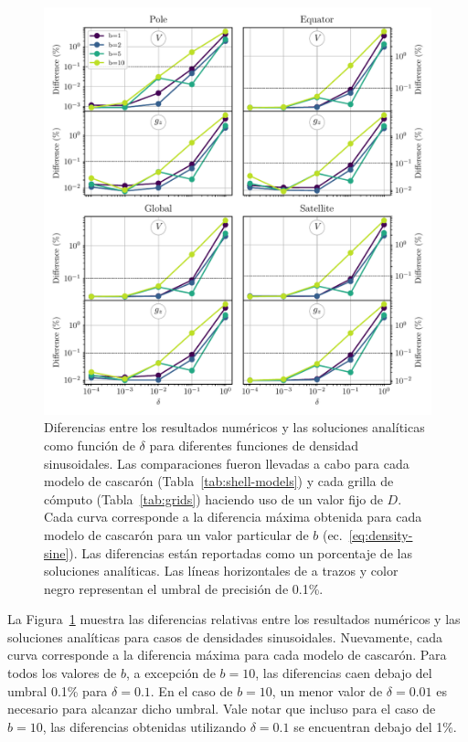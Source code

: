 \begin{figure}
\centering
\includegraphics[width=\linewidth]{figs/tesseroids-variable-density/sine-density-diffs.pdf}
\caption{
    Diferencias entre los resultados numéricos y las soluciones analíticas como
    función de $\delta$ para diferentes funciones de densidad sinusoidales.
    Las comparaciones fueron llevadas a cabo para cada modelo de cascarón
    (Tabla~\ref{tab:shell-models}) y cada grilla de cómputo
    (Tabla~\ref{tab:grids}) haciendo uso de un valor fijo de $D$.
    Cada curva corresponde a la diferencia máxima obtenida para cada modelo de
    cascarón para un valor particular de $b$ (ec.~\ref{eq:density-sine}).
    Las diferencias están reportadas como un porcentaje de las soluciones
    analíticas. Las líneas horizontales de a trazos y color negro representan
    el umbral de precisión de 0.1\%.
    }
\label{fig:delta-sine}
\end{figure}

La Figura~\ref{fig:delta-sine}
muestra las diferencias relativas entre los resultados numéricos y las
soluciones analíticas para casos de densidades sinusoidales.
Nuevamente, cada curva corresponde a la diferencia máxima para cada modelo de
cascarón.
Para todos los valores de $b$, a excepción de $b=10$, las diferencias caen
debajo del umbral 0.1\% para $\delta = 0.1$.
En el caso de $b=10$, un menor valor de $\delta = 0.01$ es necesario para
alcanzar dicho umbral.
Vale notar que incluso para el caso de $b=10$, las diferencias obtenidas
utilizando $\delta = 0.1$ se encuentran debajo del 1\%.


